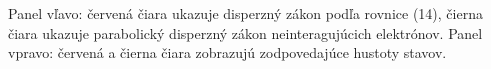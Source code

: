 \documentclass[
	11pt, %
]{beamer}
\begin{document}
\begin{frame}
\begin{figure}
    \vspace{-10mm}
    \small
    \normalsize
    \label{fig:example}%
\end{figure}
Panel vľavo: červená čiara ukazuje disperzný zákon podľa rovnice (14), čierna čiara ukazuje parabolický disperzný zákon neinteragujúcich elektrónov. Panel vpravo: červená a čierna čiara zobrazujú zodpovedajúce hustoty stavov.
\end{frame}
\end{document}
